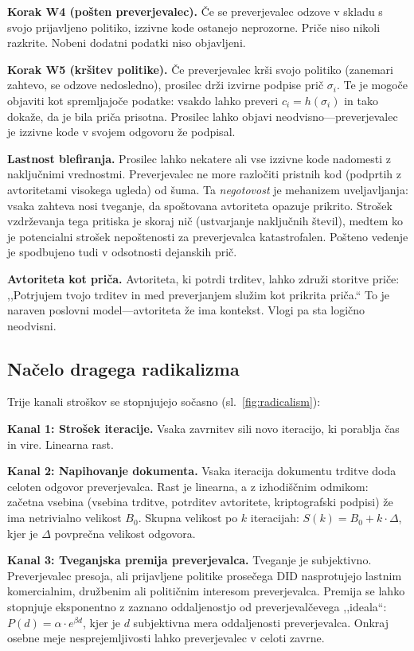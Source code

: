 \documentclass[11pt,a4paper,twocolumn]{article}
\begin{document}
\textbf{Korak W4 (pošten preverjevalec).} Če se preverjevalec odzove v skladu s svojo prijavljeno politiko, izzivne kode ostanejo neprozorne. Priče niso nikoli razkrite. Nobeni dodatni podatki niso objavljeni.

\textbf{Korak W5 (kršitev politike).} Če preverjevalec krši svojo politiko (zanemari zahtevo, se odzove nedosledno), prosilec drži izvirne podpise prič $\sigma_i$. Te je mogoče objaviti kot spremljajoče podatke: vsakdo lahko preveri $c_i = h(\sigma_i)$ in tako dokaže, da je bila priča prisotna. Prosilec lahko objavi neodvisno---preverjevalec je izzivne kode v svojem odgovoru že podpisal.

\textbf{Lastnost blefiranja.} Prosilec lahko nekatere ali vse izzivne kode nadomesti z naključnimi vrednostmi. Preverjevalec ne more razločiti pristnih kod (podprtih z avtoritetami visokega ugleda) od šuma. Ta \emph{negotovost} je mehanizem uveljavljanja: vsaka zahteva nosi tveganje, da spoštovana avtoriteta opazuje prikrito. Strošek vzdrževanja tega pritiska je skoraj nič (ustvarjanje naključnih števil), medtem ko je potencialni strošek nepoštenosti za preverjevalca katastrofalen. Pošteno vedenje je spodbujeno tudi v odsotnosti dejanskih prič.

\textbf{Avtoriteta kot priča.} Avtoriteta, ki potrdi trditev, lahko združi storitve priče: ,,Potrjujem tvojo trditev in med preverjanjem služim kot prikrita priča.`` To je naraven poslovni model---avtoriteta že ima kontekst. Vlogi pa sta logično neodvisni.

\subsection{Načelo dragega radikalizma}

Trije kanali stroškov se stopnjujejo sočasno (sl.~\ref{fig:radicalism}):

\textbf{Kanal 1: Strošek iteracije.} Vsaka zavrnitev sili novo iteracijo, ki porablja čas in vire. Linearna rast.

\textbf{Kanal 2: Napihovanje dokumenta.} Vsaka iteracija dokumentu trditve doda celoten odgovor preverjevalca. Rast je linearna, a z izhodiščnim odmikom: začetna vsebina (vsebina trditve, potrditev avtoritete, kriptografski podpisi) že ima netrivialno velikost $B_0$. Skupna velikost po $k$ iteracijah: $S(k) = B_0 + k \cdot \Delta$, kjer je $\Delta$ povprečna velikost odgovora.

\textbf{Kanal 3: Tveganjska premija preverjevalca.} Tveganje je subjektivno. Preverjevalec presoja, ali prijavljene politike prosečega DID nasprotujejo lastnim komercialnim, družbenim ali političnim interesom preverjevalca. Premija se lahko stopnjuje eksponentno z zaznano oddaljenostjo od preverjevalčevega ,,ideala``: $P(d) = \alpha \cdot e^{\beta d}$, kjer je $d$ subjektivna mera oddaljenosti preverjevalca. Onkraj osebne meje nesprejemljivosti lahko preverjevalec v celoti zavrne.
\end{document}
